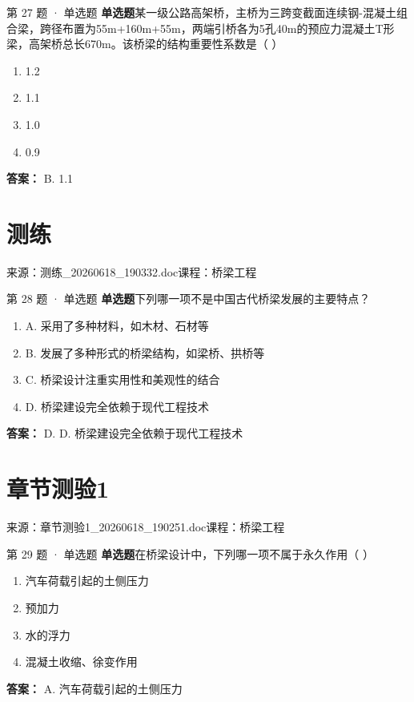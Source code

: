\documentclass[UTF8,zihao=-4,openany]{ctexbook}
\newenvironment{choices}{\begin{enumerate}[label=\Alph*.,leftmargin=9mm,labelsep=3mm,itemsep=2pt,topsep=4pt]}{\end{enumerate}}
\newcommand{\qtype}[1]{\textcolor{brand}{\sffamily\bfseries #1}}
\newcommand{\sourcefile}[1]{\textcolor{muted}{\small\sffamily 来源：#1}}
\begin{document}
\begin{questionbox}{第 27 题 · 单选题}
\qtype{单选题}\quad 某一级公路高架桥，主桥为三跨变截面连续钢-混凝土组合梁，跨径布置为55m+160m+55m，两端引桥各为5孔40m的预应力混凝土T形梁，高架桥总长670m。该桥梁的结构重要性系数是（ ）
\begin{choices}
\item 1.2
\item 1.1
\item 1.0
\item 0.9
\end{choices}
\begin{answerbox}
\textbf{答案：} B. 1.1
\end{answerbox}
\end{questionbox}

\chapter{测练}

\sourcefile{测练\_20260618\_190332.doc}\quad \textcolor{muted}{\small\sffamily 课程：桥梁工程}

\begin{questionbox}{第 28 题 · 单选题}
\qtype{单选题}\quad 下列哪一项不是中国古代桥梁发展的主要特点？
\begin{choices}
\item A. 采用了多种材料，如木材、石材等
\item B. 发展了多种形式的桥梁结构，如梁桥、拱桥等
\item C. 桥梁设计注重实用性和美观性的结合
\item D. 桥梁建设完全依赖于现代工程技术
\end{choices}
\begin{answerbox}
\textbf{答案：} D. D. 桥梁建设完全依赖于现代工程技术
\end{answerbox}
\end{questionbox}

\chapter{章节测验1}

\sourcefile{章节测验1\_20260618\_190251.doc}\quad \textcolor{muted}{\small\sffamily 课程：桥梁工程}

\begin{questionbox}{第 29 题 · 单选题}
\qtype{单选题}\quad 在桥梁设计中，下列哪一项不属于永久作用（ ）
\begin{choices}
\item 汽车荷载引起的土侧压力
\item 预加力
\item 水的浮力
\item 混凝土收缩、徐变作用
\end{choices}
\begin{answerbox}
\textbf{答案：} A. 汽车荷载引起的土侧压力
\end{answerbox}
\end{questionbox}
\end{document}
